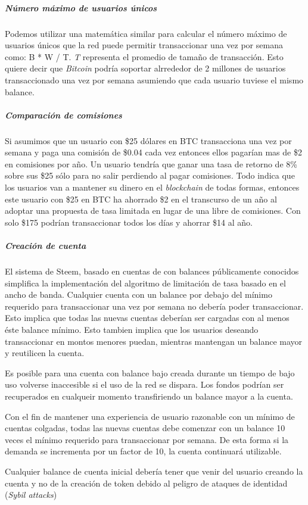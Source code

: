 \documentclass[a4paper,titlepage,final]{article}
\begin{document}
\subparagraph{Número máximo de usuarios únicos}

Podemos utilizar una matemática similar para calcular el número máximo de usuarios únicos que la red puede permitir transaccionar una vez por semana como: B * W / T. \textit{T} representa el promedio de tamaño de transacción. Esto quiere decir que \textit{Bitcoin} podría soportar alrrededor de 2 millones de usuarios transaccionado una vez por semana asumiendo que cada usuario tuviese el mismo balance.

\subparagraph{Comparación de comisiones}

Si asumimos que un usuario con \$25 dólares en BTC transacciona una vez por semana y paga una comisión de \$0.04 cada vez entonces ellos pagarían mas de \$2 en comisiones por año. Un usuario tendría que ganar una tasa de retorno de 8\% sobre sus \$25 sólo para no salir perdiendo al pagar comisiones. Todo indica que los usuarios van a mantener su dinero en el \textit{blockchain} de todas formas, entonces este usuario con \$25 en BTC ha ahorrado \$2 en el transcurso de un año al adoptar una propuesta de tasa limitada en lugar de una libre de comisiones. Con solo \$175 podrían transaccionar todos los días y ahorrar \$14 al año.

\subparagraph{Creación de cuenta}

El sistema de Steem, basado en cuentas de con balances públicamente conocidos simplifica la implementación del algoritmo de limitación de tasa basado en el ancho de banda. Cualquier cuenta con un balance por debajo del mínimo requerido para transaccionar una vez por semana no debería poder transaccionar. Esto implica que todas las nuevas cuentas deberían ser cargadas con al menos éste balance mínimo. Esto tambien implica que los usuarios deseando transaccionar en montos menores puedan, mientras mantengan un balance mayor y reutilicen la cuenta.

Es posible para una cuenta con balance bajo creada durante un tiempo de bajo uso volverse inaccesible si el uso de la red se dispara. Los fondos podrían ser recuperados en cualqueir momento transfiriendo un balance mayor a la cuenta.

Con el fin de mantener una experiencia de usuario razonable con un mínimo de cuentas colgadas, todas las nuevas cuentas debe comenzar con un balance 10 veces el mínimo requerido para transaccionar por semana. De esta forma si la demanda se incrementa por un factor de 10, la cuenta continuará utilizable.

Cualquier balance de cuenta inicial debería tener que venir del usuario creando la cuenta y no de la creación de token debido al peligro de ataques de identidad (\textit{Sybil attacks})
\end{document}
